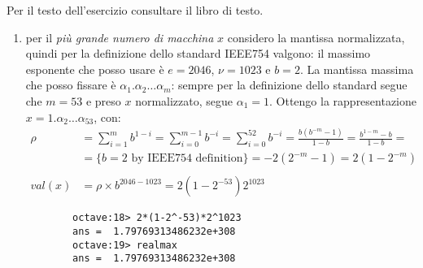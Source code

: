 \begin{exercise}[1.10]
Per il testo dell'esercizio consultare il libro di testo.
\end{exercise}
\begin{enumerate}
	\item per il \emph{pi\`u grande numero di macchina} $x$ considero la mantissa normalizzata,
	quindi per la definizione dello standard IEEE754 valgono: il massimo esponente che posso
	usare \`e $e = 2046$, $\nu = 1023$ e $b = 2$.
	La mantissa massima che posso fissare \`e $\alpha_{1}.\alpha_{2} \ldots \alpha_{m}$:
	sempre per la definizione dello standard segue che $m = 53$ e preso $x$ normalizzato,
	segue $\alpha_{1} = 1$. Ottengo la rappresentazione $x = 1.\alpha_{2} \ldots \alpha_{53}$, con:
	\begin{displaymath}
	\begin{split}
		\rho &= \sum_{i = 1}^{m}{b^{1-i}} = \sum_{i = 0}^{m-1}{b^{-i}} = 
			\sum_{i = 0}^{52}{b^{-i}} = 
			\frac{b\left( b^{-m} - 1 \right)}{1 - b} = \frac{b^{1-m} - b}{1 - b} = \\
			&= \lbrace b = 2 \text{ by IEEE754 definition} \rbrace = -2(2^{-m}-1) = 
			2(1 - 2^{-m}) \\ \\
		val(x) &= \rho \times b^{2046-1023} = 2(1-2^{-53})2^{1023}
	\end{split}
	\end{displaymath}
	\begin{lstlisting}
		octave:18> 2*(1-2^-53)*2^1023
		ans =  1.79769313486232e+308
		octave:19> realmax
		ans =  1.79769313486232e+308
	\end{lstlisting}


\end{enumerate}



